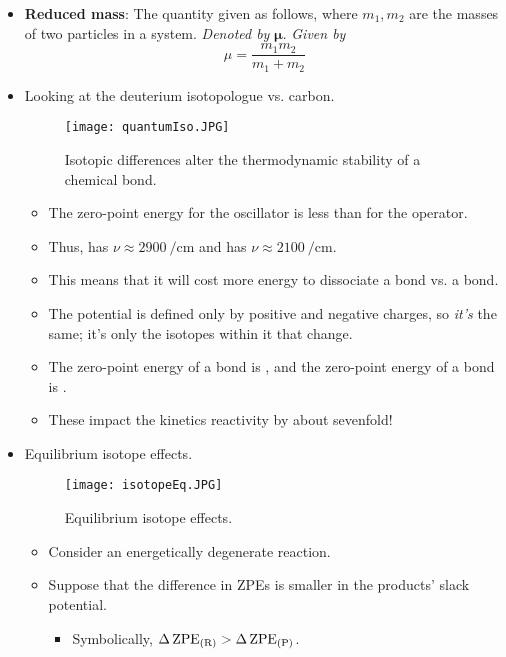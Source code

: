 \documentclass[../notes.tex]{subfiles}
\begin{document}
\begin{itemize}
    \item \textbf{Reduced mass}: The quantity given as follows, where $m_1,m_2$ are the masses of two particles in a system. \emph{Denoted by} $\bm{\mu}$. \emph{Given by}
    \begin{equation*}
        \mu = \frac{m_1m_2}{m_1+m_2}
    \end{equation*}
    \item Looking at the deuterium isotopologue vs. carbon.
    \begin{figure}[h!]
        \centering
        \texttt{[image: quantumIso.JPG]}
        \caption{Isotopic differences alter the thermodynamic stability of a chemical bond.}
        \label{fig:quantumIso}
    \end{figure}
    \begin{itemize}
        \item The zero-point energy for the  oscillator is less than for the  operator.
        \item Thus,  has $\nu\approx\SI{2900}{\per\centi\meter}$ and  has $\nu\approx\SI{2100}{\per\centi\meter}$.
        \item This means that it will cost more energy to dissociate a  bond vs. a  bond.
        \item The potential is defined only by positive and negative charges, so \emph{it's} the same; it's only the isotopes within it that change.
        \item The zero-point energy of a  bond is , and the zero-point energy of a  bond is .
        \item These  impact the kinetics reactivity by about sevenfold!
    \end{itemize}
    \pagebreak
    \item Equilibrium isotope effects.
    \begin{figure}[h!]
        \centering
        \texttt{[image: isotopeEq.JPG]}
        \caption{Equilibrium isotope effects.}
        \label{fig:isotopeEq}
    \end{figure}
    \begin{itemize}
        \item Consider an energetically degenerate reaction.
        \item Suppose that the difference in ZPEs is smaller in the products' slack potential.
        \begin{itemize}
            \item Symbolically, $\Delta\operatorname{ZPE}_\text{(R)}>\Delta\operatorname{ZPE}_\text{(P)}$.

\end{itemize}
\end{itemize}
\end{itemize}
\end{document}
